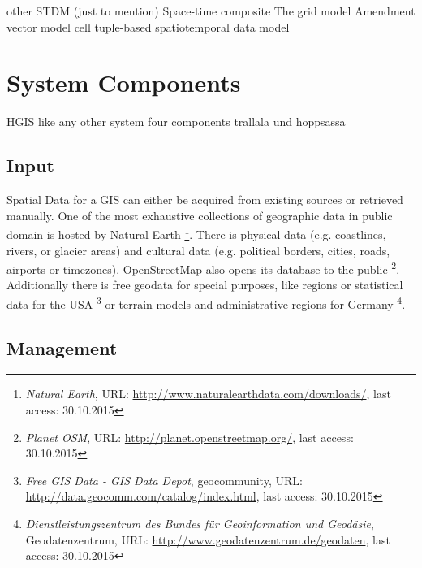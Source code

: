 other STDM (just to mention)
  Space-time composite
  The grid model
  Amendment vector model
  cell tuple-based spatiotemporal data model
  \cite[p. 14]{zhao11}



\section{System Components} %
\label{sec:system_components}

HGIS like any other system four components
trallala und hoppsassa

\subsection{Input} %
\label{sub:input}

Spatial Data for a GIS can either be acquired from existing sources or retrieved manually. One of the most exhaustive collections of geographic data in public domain is hosted by Natural Earth
\footnote{
  \textit{Natural Earth},
  URL: \url{http://www.naturalearthdata.com/downloads/},
  last access: 30.10.2015
}.
There is physical data (e.g. coastlines, rivers, or glacier areas) and cultural data (e.g. political borders, cities, roads, airports or timezones). OpenStreetMap also opens its database to the public
\footnote{
  \textit{Planet OSM},
  URL: \url{http://planet.openstreetmap.org/},
  last access: 30.10.2015
}.
Additionally there is free geodata for special purposes, like regions or statistical data for the USA
\footnote{
  \textit{Free GIS Data - GIS Data Depot},
  geocommunity,
  URL: \url{http://data.geocomm.com/catalog/index.html},
  last access: 30.10.2015
}
or terrain models and administrative regions for Germany
\footnote{
  \textit{Dienstleistungszentrum des Bundes für Geoinformation und Geodäsie},
  Geodatenzentrum,
  URL: \url{http://www.geodatenzentrum.de/geodaten},
  last access: 30.10.2015
}.


\subsection{Management} %
\label{sub:management}

